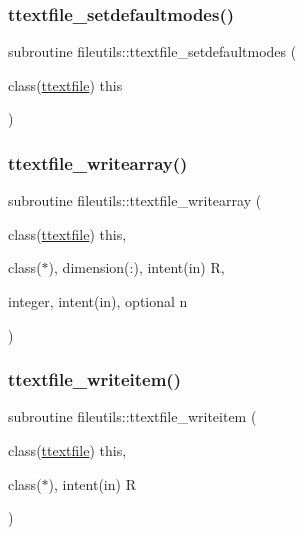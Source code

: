 \mbox{\label{namespacefileutils_a40d911d4c6f3119ad169ba092b5d8131}} 
\subsubsection{\texorpdfstring{ttextfile\+\_\+setdefaultmodes()}{ttextfile\_setdefaultmodes()}}
{\footnotesize\ttfamily subroutine fileutils\+::ttextfile\+\_\+setdefaultmodes (\begin{DoxyParamCaption}\item[{class(\mbox{\hyperlink{structfileutils_1_1ttextfile}{ttextfile}})}]{this }\end{DoxyParamCaption})\hspace{0.3cm}{\ttfamily [private]}}

\mbox{\label{namespacefileutils_a8df98772000e2733576f361e197fa37a}} 
\subsubsection{\texorpdfstring{ttextfile\+\_\+writearray()}{ttextfile\_writearray()}}
{\footnotesize\ttfamily subroutine fileutils\+::ttextfile\+\_\+writearray (\begin{DoxyParamCaption}\item[{class(\mbox{\hyperlink{structfileutils_1_1ttextfile}{ttextfile}})}]{this,  }\item[{class($\ast$), dimension(\+:), intent(in)}]{R,  }\item[{integer, intent(in), optional}]{n }\end{DoxyParamCaption})\hspace{0.3cm}{\ttfamily [private]}}

\mbox{\label{namespacefileutils_a0b6a6b2a921c679e8226e4c2b11775d0}} 
\subsubsection{\texorpdfstring{ttextfile\+\_\+writeitem()}{ttextfile\_writeitem()}}
{\footnotesize\ttfamily subroutine fileutils\+::ttextfile\+\_\+writeitem (\begin{DoxyParamCaption}\item[{class(\mbox{\hyperlink{structfileutils_1_1ttextfile}{ttextfile}})}]{this,  }\item[{class($\ast$), intent(in)}]{R }\end{DoxyParamCaption})\hspace{0.3cm}{\ttfamily [private]}}

